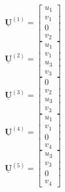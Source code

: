 \documentclass[12pt,a4paper]{article}
\def\vec#1{\underline{\mathbf{#1}}}
\begin{document}
\begin{multicols}{7}
    \noindent
    \begin{equation*}
        \vec{U}^{\left(1\right)}=
        \begin{bmatrix}
            u_1 \\
            v_1 \\
            0   \\
            v_2
        \end{bmatrix}
    \end{equation*}
    \columnbreak
    \begin{equation*}
        \vec{U}^{\left(2\right)}=
        \begin{bmatrix}
            u_1 \\
            v_1 \\
            u_3 \\
            v_3
        \end{bmatrix}
    \end{equation*}
    \columnbreak
    \begin{equation*}
        \vec{U}^{\left(3\right)}=
        \begin{bmatrix}
            0   \\
            v_2 \\
            u_3 \\
            v_3
        \end{bmatrix}
    \end{equation*}
    \columnbreak
    \begin{equation*}
        \vec{U}^{\left(4\right)}=
        \begin{bmatrix}
            u_1 \\
            v_1 \\
            0   \\
            v_4
        \end{bmatrix}
    \end{equation*}
    \begin{equation*}
        \vec{U}^{\left(5\right)}=
        \begin{bmatrix}
            u_3 \\
            v_3 \\
            0   \\
            v_4
        \end{bmatrix}
    \end{equation*}

\end{multicols}
\end{document}
